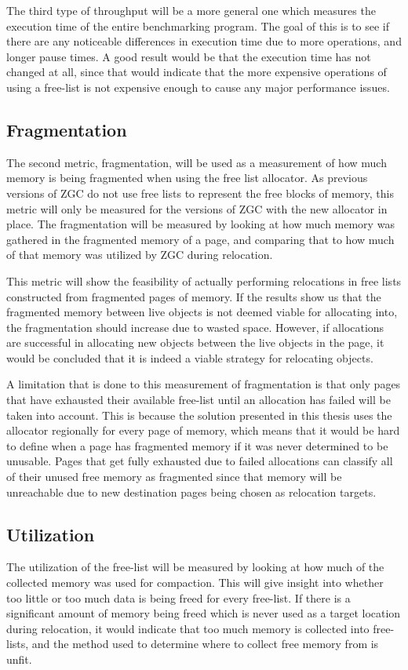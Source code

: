 The third type of throughput will be a more general one which measures the execution time of the entire benchmarking program. The goal of this is to see if there are any noticeable differences in execution time due to more operations, and longer pause times. A good result would be that the execution time has not changed at all, since that would indicate that the more expensive operations of using a free-list is not expensive enough to cause any major performance issues.

\subsection{Fragmentation}
The second metric, fragmentation, will be used as a measurement of how much memory is being fragmented when using the free list allocator. As previous versions of ZGC do not use free lists to represent the free blocks of memory, this metric will only be measured for the versions of ZGC with the new allocator in place. The fragmentation will be measured by looking at how much memory was gathered in the fragmented memory of a page, and comparing that to how much of that memory was utilized by ZGC during relocation.

This metric will show the feasibility of actually performing relocations in free lists constructed from fragmented pages of memory. If the results show us that the fragmented memory between live objects is not deemed viable for allocating into, the fragmentation should increase due to wasted space. However, if allocations are successful in allocating new objects between the live objects in the page, it would be concluded that it is indeed a viable strategy for relocating objects.

A limitation that is done to this measurement of fragmentation is that only pages that have exhausted their available free-list until an allocation has failed will be taken into account. This is because the solution presented in this thesis uses the allocator regionally for every page of memory, which means that it would be hard to define when a page has fragmented memory if it was never determined to be unusable. Pages that get fully exhausted due to failed allocations can classify all of their unused free memory as fragmented since that memory will be unreachable due to new destination pages being chosen as relocation targets.

\subsection{Utilization}
The utilization of the free-list will be measured by looking at how much of the collected memory was used for compaction. This will give insight into whether too little or too much data is being freed for every free-list. If there is a significant amount of memory being freed which is never used as a target location during relocation, it would indicate that too much memory is collected into free-lists, and the method used to determine where to collect free memory from is unfit.

